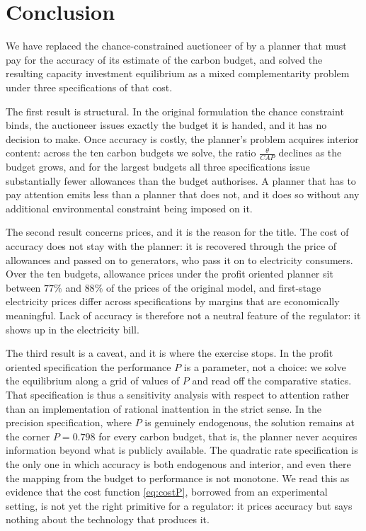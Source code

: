 \documentclass[a4paper,fleqn]{cas-dc}
\begin{document}
\newpage
\section{Conclusion}\label{sec:conclusion}

We have replaced the chance-constrained auctioneer of \citet{amigo_two_2021} by a planner that must pay for the accuracy of its estimate of the carbon budget, and solved the resulting capacity investment equilibrium as a mixed complementarity problem under three specifications of that cost.

The first result is structural. In the original formulation the chance constraint binds, the auctioneer issues exactly the budget it is handed, and it has no decision to make. Once accuracy is costly, the planner's problem acquires interior content: across the ten carbon budgets we solve, the ratio $\frac{\theta}{CAP}$ declines as the budget grows, and for the largest budgets all three specifications issue substantially fewer allowances than the budget authorises. A planner that has to pay attention emits less than a planner that does not, and it does so without any additional environmental constraint being imposed on it.

The second result concerns prices, and it is the reason for the title. The cost of accuracy does not stay with the planner: it is recovered through the price of allowances and passed on to generators, who pass it on to electricity consumers. Over the ten budgets, allowance prices under the profit oriented planner sit between $77\%$ and $88\%$ of the prices of the original model, and first-stage electricity prices differ across specifications by margins that are economically meaningful. Lack of accuracy is therefore not a neutral feature of the regulator: it shows up in the electricity bill.

The third result is a caveat, and it is where the exercise stops. In the profit oriented specification the performance $P$ is a parameter, not a choice: we solve the equilibrium along a grid of values of $P$ and read off the comparative statics. That specification is thus a sensitivity analysis with respect to attention rather than an implementation of rational inattention in the strict sense. In the precision specification, where $P$ is genuinely endogenous, the solution remains at the corner $P=0.798$ for every carbon budget, that is, the planner never acquires information beyond what is publicly available. The quadratic rate specification is the only one in which accuracy is both endogenous and interior, and even there the mapping from the budget to performance is not monotone. We read this as evidence that the cost function \eqref{eq:costP}, borrowed from an experimental setting, is not yet the right primitive for a regulator: it prices accuracy but says nothing about the technology that produces it.
\end{document}
